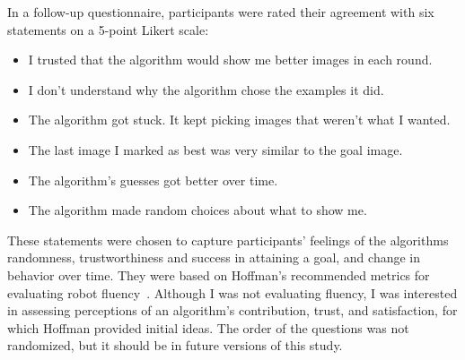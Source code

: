 In a follow-up questionnaire, participants were rated their agreement with six statements on a 5-point Likert scale:
\begin{itemize}[noitemsep]
\item I trusted that the algorithm would show me better images in each round.
\item I don't understand why the algorithm chose the examples it did.
\item The algorithm got stuck.  It kept picking images that weren't what I wanted.
\item The last image I marked as best was very similar to the goal image.
\item The algorithm's guesses got better over time.
\item The algorithm made random choices about what to show me.
\end{itemize}
These statements were chosen to capture participants' feelings of the algorithms randomness, trustworthiness and success in attaining a goal, and change in behavior over time.
They were based on Hoffman's recommended metrics for evaluating robot fluency~\cite{hoffman_evaluating_2013}.
Although I was not evaluating fluency, I was interested in assessing perceptions of an algorithm's contribution, trust, and satisfaction, for which Hoffman provided initial ideas.
The order of the questions was not randomized, but it should be in future versions of this study.
